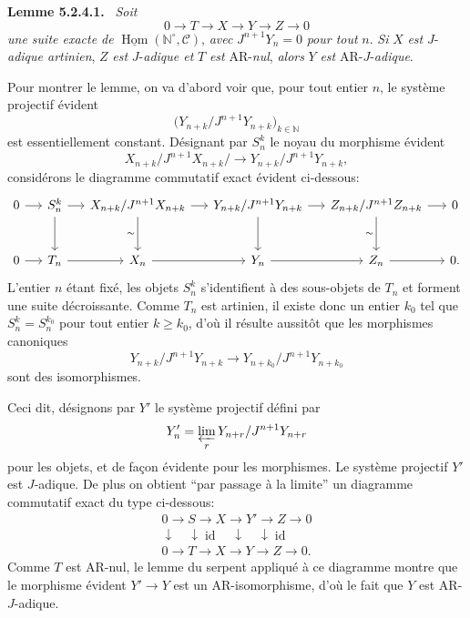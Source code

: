 \documentclass[11pt]{article}
\newenvironment{statement}[1]{\par\medskip\noindent\textbf{#1.}\ }{\par\medskip}
\DeclareMathOperator{\Hom}{Hom}
\providecommand{\uHom}{\underline{\Hom}}
\providecommand{\id}{\operatorname{id}}
\providecommand{\Hom}{\operatorname{Hom}}
\providecommand{\id}{\operatorname{id}}
\providecommand{\id}{\operatorname{id}}
\providecommand{\id}{\operatorname{id}}
\providecommand{\id}{\operatorname{id}}
\providecommand{\Hom}{\operatorname{Hom}}
\providecommand{\id}{\operatorname{id}}
\begin{document}
\begin{statement}{Lemme 5.2.4.1}
\emph{Soit}
\[
0\longrightarrow T\longrightarrow X\longrightarrow Y\longrightarrow Z\longrightarrow0
\]
\emph{une suite exacte de} \(\uHom(\mathbb N^\circ,\mathcal C)\), \emph{avec} \(J^{n+1}Y_n=0\) \emph{pour tout} \(n\). \emph{Si} \(X\) \emph{est} \(J\)-\emph{adique artinien}, \(Z\) \emph{est} \(J\)-\emph{adique et} \(T\) \emph{est} AR-\emph{nul}, \emph{alors} \(Y\) \emph{est} AR-\(J\)-\emph{adique}.
\end{statement}

Pour montrer le lemme, on va d'abord voir que, pour tout entier \(n\), le système projectif évident
\[
\bigl(Y_{n+k}/J^{n+1}Y_{n+k}\bigr)_{k\in\mathbb N}
\]
est essentiellement constant. Désignant par \(S_n^k\) le noyau du morphisme évident
\[
X_{n+k}/J^{n+1}X_{n+k}/\longrightarrow
Y_{n+k}/J^{n+1}Y_{n+k},
\]
considérons le diagramme commutatif exact évident ci-dessous:
\[
\begin{tikzcd}[column sep=1.35em,row sep=large]
0 \arrow[r] & S_n^k \arrow[r] \arrow[d] & X_{n+k}/J^{n+1}X_{n+k} \arrow[r] \arrow[d,"\sim"'] & Y_{n+k}/J^{n+1}Y_{n+k} \arrow[r] \arrow[d] & Z_{n+k}/J^{n+1}Z_{n+k} \arrow[r] \arrow[d,"\sim"'] & 0\\
0 \arrow[r] & T_n \arrow[r] & X_n \arrow[r] & Y_n \arrow[r] & Z_n \arrow[r] & 0 .
\end{tikzcd}
\]
L'entier \(n\) étant fixé, les objets \(S_n^k\) s'identifient à des sous-objets de \(T_n\) et forment une suite décroissante. Comme \(T_n\) est artinien, il existe donc un entier \(k_0\) tel que \(S_n^k=S_n^{k_0}\) pour tout entier \(k\ge k_0\), d'où il résulte aussitôt que les morphismes canoniques
\[
Y_{n+k}/J^{n+1}Y_{n+k}
\longrightarrow
Y_{n+k_0}/J^{n+1}Y_{n+k_0}
\]
sont des isomorphismes.

Ceci dit, désignons par \(Y'\) le système projectif défini par
\[
Y'_n=\varprojlim_r Y_{n+r}/J^{n+1}Y_{n+r}
\]
pour les objets, et de façon évidente pour les morphismes. Le système projectif \(Y'\) est \(J\)-adique. De plus on obtient ``par passage à la limite'' un diagramme commutatif exact du type ci-dessous:
\[
\begin{array}{ccccc}
0\to S\to X\to Y'\to Z\to0\\
\downarrow\quad\downarrow\id\quad\downarrow\quad\downarrow\id\\
0\to T\to X\to Y\to Z\to0 .
\end{array}
\]
Comme \(T\) est AR-nul, le lemme du serpent appliqué à ce diagramme montre que le morphisme évident \(Y'\to Y\) est un AR-isomorphisme, d'où le fait que \(Y\) est AR-\(J\)-adique.
\end{document}
